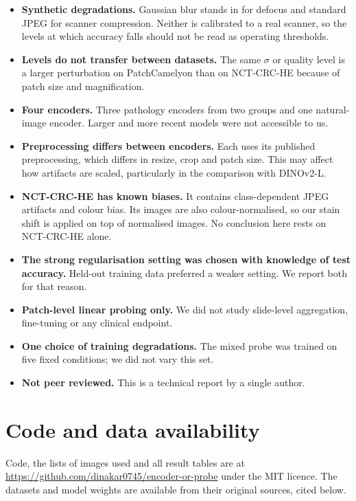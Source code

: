\documentclass[11pt,a4paper]{article}
\begin{document}
\begin{itemize}
\item \textbf{Synthetic degradations.} Gaussian blur stands in for defocus and standard JPEG for scanner compression. Neither is calibrated to a real scanner, so the levels at which accuracy falls should not be read as operating thresholds.
\item \textbf{Levels do not transfer between datasets.} The same $\sigma$ or quality level is a larger perturbation on PatchCamelyon than on NCT-CRC-HE because of patch size and magnification.
\item \textbf{Four encoders.} Three pathology encoders from two groups and one natural-image encoder. Larger and more recent models were not accessible to us.
\item \textbf{Preprocessing differs between encoders.} Each uses its published preprocessing, which differs in resize, crop and patch size. This may affect how artifacts are scaled, particularly in the comparison with DINOv2-L.
\item \textbf{NCT-CRC-HE has known biases.} It contains class-dependent JPEG artifacts and colour bias. Its images are also colour-normalised, so our stain shift is applied on top of normalised images. No conclusion here rests on NCT-CRC-HE alone.
\item \textbf{The strong regularisation setting was chosen with knowledge of test accuracy.} Held-out training data preferred a weaker setting. We report both for that reason.
\item \textbf{Patch-level linear probing only.} We did not study slide-level aggregation, fine-tuning or any clinical endpoint.
\item \textbf{One choice of training degradations.} The mixed probe was trained on five fixed conditions; we did not vary this set.
\item \textbf{Not peer reviewed.} This is a technical report by a single author.
\end{itemize}

\sloppy
\section*{Code and data availability}

Code, the lists of images used and all result tables are at \url{https://github.com/dinakar0745/encoder-or-probe} under the MIT licence. The datasets and model weights are available from their original sources, cited below.
\end{document}
